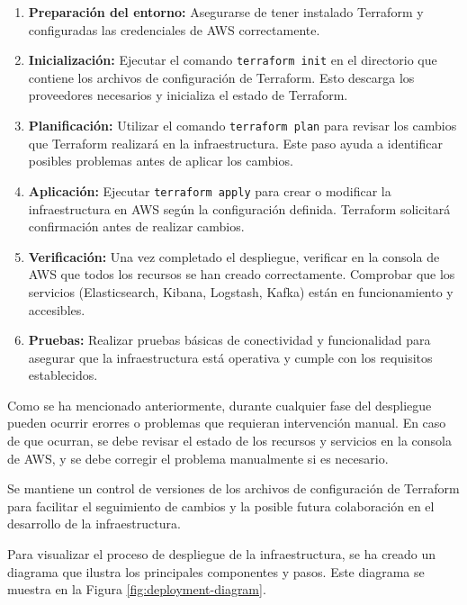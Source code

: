 \begin{enumerate}
    \item \textbf{Preparación del entorno:} Asegurarse de tener instalado
    Terraform y configuradas las credenciales de AWS correctamente.

    \item \textbf{Inicialización:} Ejecutar el comando \texttt{terraform init}
    en el directorio que contiene los archivos de configuración de Terraform.
    Esto descarga los proveedores necesarios y inicializa el estado de
    Terraform.

    \item \textbf{Planificación:} Utilizar el comando \texttt{terraform plan}
    para revisar los cambios que Terraform realizará en la infraestructura.
    Este paso ayuda a identificar posibles problemas antes de aplicar los
    cambios.

    \item \textbf{Aplicación:} Ejecutar \texttt{terraform apply} para crear o
    modificar la infraestructura en AWS según la configuración definida.
    Terraform solicitará confirmación antes de realizar cambios.

    \item \textbf{Verificación:} Una vez completado el despliegue, verificar
    en la consola de AWS que todos los recursos se han creado correctamente.
    Comprobar que los servicios (Elasticsearch, Kibana, Logstash, Kafka) están
    en funcionamiento y accesibles.

    \item \textbf{Pruebas:} Realizar pruebas básicas de conectividad y
    funcionalidad para asegurar que la infraestructura está operativa y
    cumple con los requisitos establecidos.
\end{enumerate}

Como se ha mencionado anteriormente, durante cualquier fase del despliegue
pueden ocurrir erorres o problemas que requieran intervención manual. En caso
de que ocurran, se debe revisar el estado de los recursos y servicios en la
consola de AWS, y se debe corregir el problema manualmente si es necesario.

Se mantiene un control de versiones de los archivos de
configuración de Terraform para facilitar el seguimiento de cambios y la
posible futura colaboración en el desarrollo de la infraestructura.

Para visualizar el proceso de despliegue de la infraestructura, se ha creado
un diagrama que ilustra los principales componentes y pasos. Este diagrama se
muestra en la Figura \ref{fig:deployment-diagram}.


